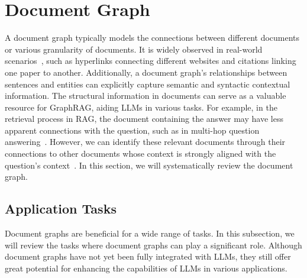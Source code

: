 \section{Document Graph \texorpdfstring{\emojidoctitle}{Document Graph}}
\label{sec-doc}


A document graph typically models the connections between different documents or various granularity of documents. It is widely observed in real-world scenarios~\citep{schuhmacher2014knowledge, sonawane2014graph, xu2020document}, such as hyperlinks connecting different websites and citations linking one paper to another. Additionally, a document graph's relationships between sentences and entities can explicitly capture semantic and syntactic contextual information. The structural information in documents can serve as a valuable resource for GraphRAG, aiding LLMs in various tasks. For example, in the retrieval process in RAG, the document containing the answer may have less apparent connections with the question, such as in multi-hop question answering~\citep{mavi2024multi}. However, we can identify these relevant documents through their connections to other documents whose context is strongly aligned with the question's context~\citep{dong2024don}. In this section, we will systematically review the document graph.



\subsection{Application Tasks}
Document graphs are beneficial for a wide range of tasks. In this subsection, we will review the tasks where document graphs can play a significant role. Although document graphs have not yet been fully integrated with LLMs, they still offer great potential for enhancing the capabilities of LLMs in various applications.

